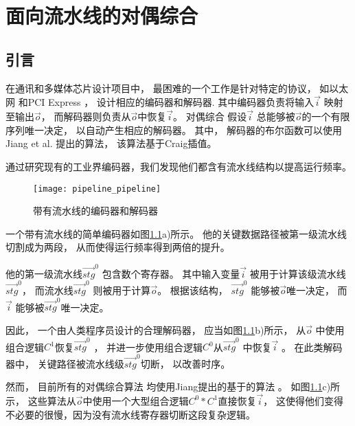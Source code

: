 \chapter{面向流水线的对偶综合}
\label{chap:5}

\section{引言}
在通讯和多媒体芯片设计项目中，
最困难的一个工作是针对特定的协议，
如以太网 和PCI Express ，
设计相应的编码器和解码器.
其中编码器负责将输入$\vec{i}$ 映射至输出$\vec{o}$，
而解码器则负责从$\vec{o}$中恢复$\vec{i}$。
对偶综合
假设$\vec{i}$ 总能够被$\vec{o}$的一个有限序列唯一决定，
以自动产生相应的解码器。
其中，
解码器的布尔函数可以使用Jiang et al. 提出的算法，
该算法基于Craig插值。

通过研究现有的工业界编码器，我们发现他们都含有流水线结构以提高运行频率。
\begin{figure}[b]
\begin{center}
\texttt{[image: pipeline\_pipeline]}
\end{center}
\caption{带有流水线的编码器和解码器}
  \label{fig_pipe}
\end{figure}

一个带有流水线的简单编码器如图\ref{fig_pipe}a)所示。
他的关键数据路径被第一级流水线切割成为两段，
从而使得运行频率得到两倍的提升。

他的第一级流水线$\vec{stg}^0$ 包含数个寄存器。
其中输入变量$\vec{i}$ 被用于计算该级流水线$\vec{stg}^0$，
而流水线$\vec{stg}^0$ 则被用于计算$\vec{o}$。
根据该结构，
$\vec{stg}^0$ 能够被$\vec{o}$唯一决定，
而$\vec{i}$ 能够被$\vec{stg}^0$唯一决定。

因此，
一个由人类程序员设计的合理解码器，
应当如图\ref{fig_pipe}b)所示，
从$\vec{o}$ 中使用组合逻辑$C^1$恢复$\vec{stg}^0$ ，
并进一步使用组合逻辑$C^0$从$\vec{stg}^0$ 中恢复$\vec{i}$ 。
在此类解码器中，
关键路径被流水线级$\vec{stg}^0$切断，
以改善时序。



然而，
目前所有的对偶综合算法
均使用Jiang提出的基于的算法 。
如图\ref{fig_pipe}c)所示，
这些算法从$\vec{o}$中使用一个大型组合逻辑$C^0*C^1$直接恢复$\vec{i}$，
这使得他们变得不必要的很慢，因为没有流水线寄存器切断这段复杂逻辑。

